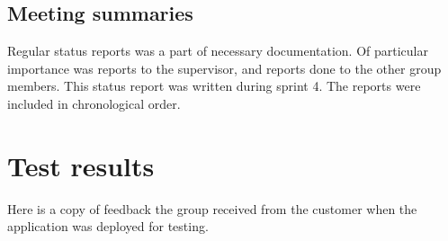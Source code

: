 \section{Meeting summaries}
Regular status reports was a part of necessary documentation. Of particular importance was reports to the supervisor, and reports done to the other group members. This status report was written during sprint 4. The reports were included in chronological order.






\chapter{Test results}
Here is a copy of feedback the group received from the customer when the application was deployed for testing. 
\label{appendix:testResults}






